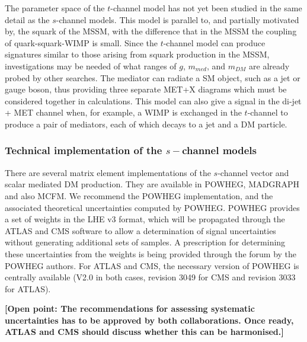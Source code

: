 \documentclass[a4,debug,notitlepage,nobib]{tufte-handout}
\newcommand{\mdm}{\ensuremath{m_{DM}}\xspace}
\newcommand{\mmed}{\ensuremath{m_{med}}\xspace}
\newif\ifATLAS
\begin{document}
The parameter space of the $t$-channel model 
has not yet been studied in the same detail as the
$s$-channel models. 
This model is parallel to, and partially motivated by, the
squark of the MSSM, with the difference that in the MSSM the 
coupling of quark-squark-WIMP is small. 
Since the $t$-channel model can produce signatures 
similar to those arising from squark production in the MSSM, investigations 
may be needed of what ranges of $g$, \mmed, and \mdm are already probed
by other searches. The mediator can radiate a SM object, such as a jet or gauge boson, 
thus providing three separate MET+X diagrams which must be considered together in
calculations. This model can also give a signal in the di-jet + MET
channel when, for example, a WIMP is exchanged in the $t$-channel to
produce a pair of mediators, each of which decays to a jet and a DM particle.

\subsubsection{Technical implementation of the $s-$channel models} 

There are several matrix element implementations of the $s$-channel
vector and scalar mediated DM production.
They are available in POWHEG, MADGRAPH
and also MCFM. We recommend the POWHEG implementation, 
and the associated theoretical uncertainties 
computed by POWHEG. 
POWHEG provides a set
of weights in the LHE v3 format, which will be propagated through the
ATLAS and CMS software to allow a determination of signal uncertainties
without generating additional sets of samples. A prescription for
determining these uncertainties from the weights is being provided
through the forum by the POWHEG authors.
For ATLAS and CMS, the necessary version of POWHEG is centrally available 
(V2.0 in both cases, revision 3049 for CMS and revision 3033 for ATLAS).

\textbf{[Open point: The recommendations for assessing systematic uncertainties has to be approved by 
both collaborations. Once ready, ATLAS and CMS should discuss whether this can be harmonised.]}

\ifATLAS 
The $s-$channel vector mediator model is included in this pilot 
MC15 request~\cite{ATLAS_PowhegPythiaMC15Test}, and instructions will be provided on a dedicated
twiki page. 
\fi
\end{document}

